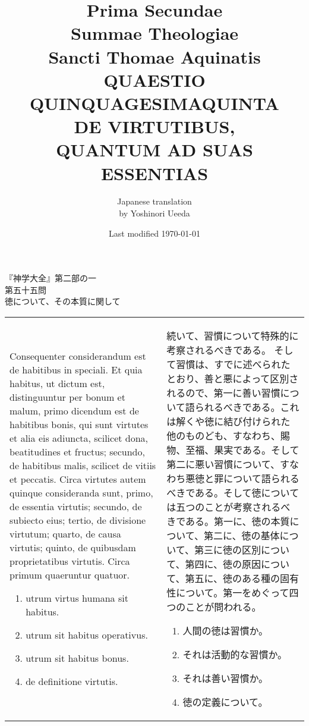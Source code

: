 \documentclass[10pt]{jsarticle}
\title{{\bf Prima Secundae}\\{\HUGE Summae Theologiae}\\Sancti Thomae
Aquinatis\\{\sffamily QUAESTIO QUINQUAGESIMAQUINTA}\\{\bf DE VIRTUTIBUS, \\QUANTUM AD SUAS ESSENTIAS}}
\author{Japanese translation\\by Yoshinori {\sc Ueeda}}
\date{Last modified \today}
\begin{document}
\maketitle
\thispagestyle{empty}
\begin{center}
{\Large 『神学大全』第二部の一\\第五十五問\\徳について、その本質に関して}
\end{center}


\begin{longtable}{p{21em}p{21em}}
Consequenter considerandum est de habitibus in speciali. Et quia
habitus, ut dictum est, distinguuntur per bonum et malum, primo
dicendum est de habitibus bonis, qui sunt virtutes et alia eis
adiuncta, scilicet dona, beatitudines et fructus; secundo, de
habitibus malis, scilicet de vitiis et peccatis. Circa virtutes autem
quinque consideranda sunt, primo, de essentia virtutis; secundo, de
subiecto eius; tertio, de divisione virtutum; quarto, de causa
virtutis; quinto, de quibusdam proprietatibus virtutis. Circa primum
quaeruntur quatuor.


\begin{enumerate}
 \item utrum virtus humana sit habitus.
 \item utrum sit habitus operativus.
 \item utrum sit habitus bonus.
 \item de definitione virtutis.
\end{enumerate}

&

続いて、習慣について特殊的に考察されるべきである。
そして習慣は、すでに述べられたとおり、善と悪によって区別されるので、第一に善い習慣について語られるべきである。これは解くや徳に結び付けられた他のものども、すなわち、賜物、至福、果実である。そして第二に悪い習慣について、すなわち悪徳と罪について語られるべきである。そして徳については五つのことが考察されるべきである。第一に、徳の本質について、第二に、徳の基体について、第三に徳の区別について、第四に、徳の原因について、第五に、徳のある種の固有性について。第一をめぐって四つのことが問われる。


\begin{enumerate}
 \item 人間の徳は習慣か。
 \item それは活動的な習慣か。
 \item それは善い習慣か。
 \item 徳の定義について。
\end{enumerate}
\end{longtable}
\end{document}
